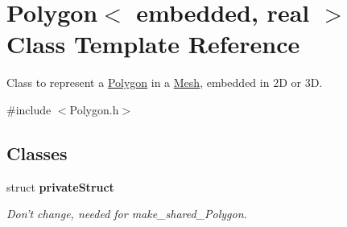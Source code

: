 \hypertarget{class_polygon}{\section{\-Polygon$<$ embedded, real $>$ \-Class \-Template \-Reference}
\label{class_polygon}
}


\-Class to represent a \hyperlink{class_polygon}{\-Polygon} in a \hyperlink{class_mesh}{\-Mesh}, embedded in 2\-D or 3\-D.  




{\ttfamily \#include $<$\-Polygon.\-h$>$}

\subsection*{\-Classes}
\begin{DoxyCompactItemize}
\item 
struct {\bfseries private\-Struct}
\begin{DoxyCompactList}\small\item\em \-Don't change, needed for make\-\_\-shared\-\_\-\-Polygon. \end{DoxyCompactList}\end{DoxyCompactItemize}
